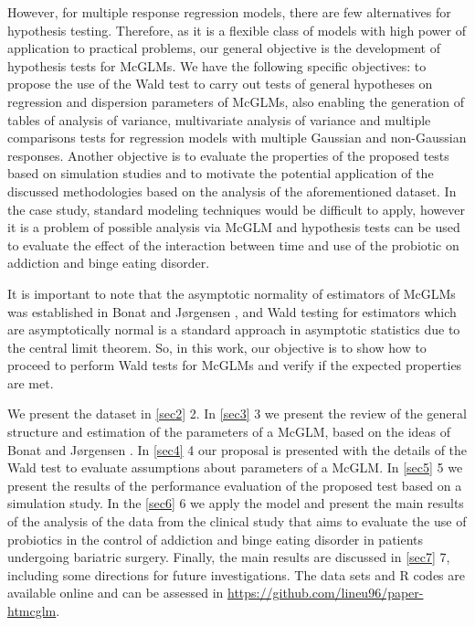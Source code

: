 \documentclass[Review,sagev,times, doublespace]{sagej}
\begin{document}
However, for multiple response regression models, there are few alternatives for hypothesis testing. Therefore, as it is a flexible class of models with high power of application to practical problems, our general objective is the development of hypothesis tests for McGLMs. We have the following specific objectives: to propose the use of the Wald test to carry out tests of general hypotheses on regression and dispersion parameters of McGLMs, also enabling the generation of tables of analysis of variance, multivariate analysis of variance and multiple comparisons tests for regression models with multiple Gaussian and non-Gaussian responses. Another objective is to evaluate the properties of the proposed tests based on simulation studies and to motivate the potential application of the discussed methodologies based on the analysis of the aforementioned dataset. In the case study, standard modeling techniques would be difficult to apply, however it is a problem of possible analysis via McGLM and hypothesis tests can be used to evaluate the effect of the interaction between time and use of the probiotic on addiction and binge eating disorder.

It is important to note that the asymptotic normality of estimators of McGLMs was established in Bonat and Jørgensen \cite{Bonat16}, and Wald testing for estimators which are asymptotically normal is a standard approach in asymptotic statistics due to the central limit theorem. So, in this work, our objective is to show how to proceed to perform Wald tests for McGLMs and verify if the expected properties are met.


We present the dataset in \autoref{sec2} 2. In \autoref{sec3} 3 we present the review of the general structure and estimation of the parameters of a McGLM, based on the ideas of Bonat and Jørgensen \cite{Bonat16}. In \autoref{sec4} 4 our proposal is presented with the details of the Wald test to evaluate assumptions about parameters of a McGLM. In \autoref{sec5} 5 we present the results of the performance evaluation of the proposed test based on a simulation study. In the \autoref{sec6} 6 we apply the model and present the main results of the analysis of the data from the clinical study that aims to evaluate the use of probiotics in the control of addiction and binge eating disorder in patients undergoing bariatric surgery. Finally, the main results are discussed in \autoref{sec7} 7, including some directions for future investigations. The data sets and R codes are available online and can be assessed in \href{https://github.com/lineu96/paper-htmcglm}{https://github.com/lineu96/paper-htmcglm}.
\end{document}
